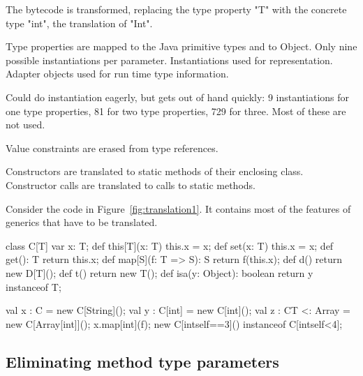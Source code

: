 \documentclass[preprint,nocopyrightspace,9pt]{sigplanconf}
\begin{document}
The bytecode is transformed, replacing the type property \xcd"T"
with the concrete type \xcd"int", the translation of \xcd"Int".


Type properties are mapped to the Java primitive types and to
Object.  Only nine possible instantiations per parameter.
Instantiations used for representation.
Adapter objects used for run time type information.

Could do instantiation eagerly, but gets out of hand quickly: 9
instantiations for one type properties, 81 for two type
properties, 729 for three.
Most of these are not used.

Value constraints are erased from type references.

Constructors are translated to static methods of their enclosing
class.
Constructor calls
are translated to calls to static methods.


Consider the code in Figure~\ref{fig:translation1}.  It contains most of the
features of generics that have to be translated.
\begin{figure*}[tp]
\begin{xten}
class C[T] {
    var x: T;
    def this[T](x: T) { this.x = x; }
    def set(x: T) { this.x = x; }
    def get(): T { return this.x; }
    def map[S](f: T => S): S { return f(this.x); }
    def d() { return new D[T](); }
    def t() { return new T(); }
    def isa(y: Object): boolean { return y instanceof T; }
}

val x : C = new C[String]();
val y : C[int] = new C[int]();
val z : C{T <: Array} = new C[Array[int]]();
x.map[int](f);
new C[int{self==3}]() instanceof C[int{self<4}];
\end{xten}
\caption{Code to translate}
\label{fig:translation1}
\end{figure*}

\subsection{Eliminating method type parameters}
\end{document}
